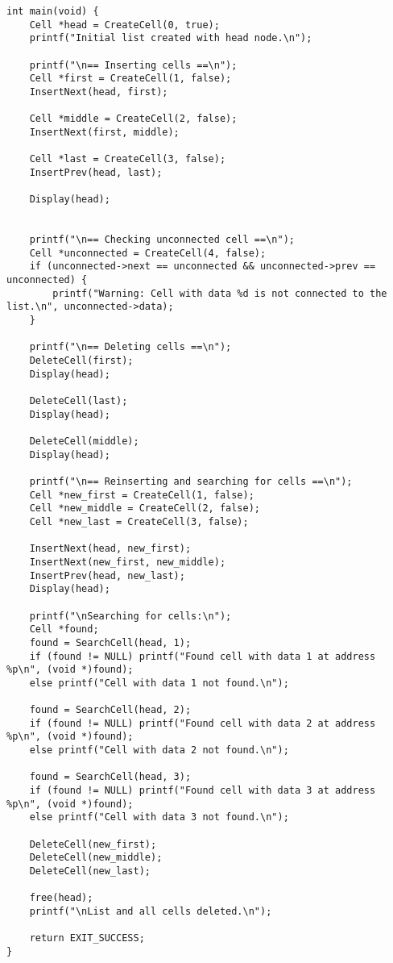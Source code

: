 \documentclass{ltjsarticle}
\begin{document}
\begin{lstlisting}
int main(void) {
    Cell *head = CreateCell(0, true);
    printf("Initial list created with head node.\n");

    printf("\n== Inserting cells ==\n");
    Cell *first = CreateCell(1, false); 
    InsertNext(head, first);           

    Cell *middle = CreateCell(2, false); 
    InsertNext(first, middle);           

    Cell *last = CreateCell(3, false); 
    InsertPrev(head, last);           

    Display(head); 

    
    printf("\n== Checking unconnected cell ==\n");
    Cell *unconnected = CreateCell(4, false); 
    if (unconnected->next == unconnected && unconnected->prev == unconnected) {
        printf("Warning: Cell with data %d is not connected to the list.\n", unconnected->data);
    }

    printf("\n== Deleting cells ==\n");
    DeleteCell(first);  
    Display(head);       

    DeleteCell(last);    
    Display(head);      

    DeleteCell(middle);  
    Display(head);       

    printf("\n== Reinserting and searching for cells ==\n");
    Cell *new_first = CreateCell(1, false); 
    Cell *new_middle = CreateCell(2, false); 
    Cell *new_last = CreateCell(3, false);   

    InsertNext(head, new_first);    
    InsertNext(new_first, new_middle); 
    InsertPrev(head, new_last);    
    Display(head);                  

    printf("\nSearching for cells:\n");
    Cell *found;
    found = SearchCell(head, 1); 
    if (found != NULL) printf("Found cell with data 1 at address %p\n", (void *)found);
    else printf("Cell with data 1 not found.\n");

    found = SearchCell(head, 2);
    if (found != NULL) printf("Found cell with data 2 at address %p\n", (void *)found);
    else printf("Cell with data 2 not found.\n");

    found = SearchCell(head, 3); 
    if (found != NULL) printf("Found cell with data 3 at address %p\n", (void *)found);
    else printf("Cell with data 3 not found.\n");

    DeleteCell(new_first);
    DeleteCell(new_middle);
    DeleteCell(new_last);

    free(head);
    printf("\nList and all cells deleted.\n");

    return EXIT_SUCCESS;
}    
\end{lstlisting}
\end{document}

